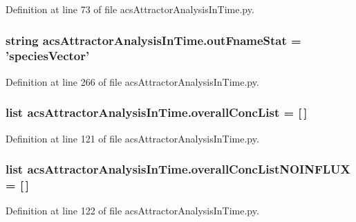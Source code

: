 Definition at line 73 of file acs\+Attractor\+Analysis\+In\+Time.\+py.

\hypertarget{a00125_a05e902a00f3333a303563029c80605de}{
\subsubsection[{out\+Fname\+Stat}]{\setlength{\rightskip}{0pt plus 5cm}string acs\+Attractor\+Analysis\+In\+Time.\+out\+Fname\+Stat = 'species\+Vector'}}\label{a00125_a05e902a00f3333a303563029c80605de}


Definition at line 266 of file acs\+Attractor\+Analysis\+In\+Time.\+py.

\hypertarget{a00125_a2cebadd75179c46e551a2facbdd2741b}{
\subsubsection[{overall\+Conc\+List}]{\setlength{\rightskip}{0pt plus 5cm}list acs\+Attractor\+Analysis\+In\+Time.\+overall\+Conc\+List = \mbox{[}$\,$\mbox{]}}}\label{a00125_a2cebadd75179c46e551a2facbdd2741b}


Definition at line 121 of file acs\+Attractor\+Analysis\+In\+Time.\+py.

\hypertarget{a00125_ad7eab833592c6cd395f9e2416dd13920}{
\subsubsection[{overall\+Conc\+List\+N\+O\+I\+N\+F\+L\+U\+X}]{\setlength{\rightskip}{0pt plus 5cm}list acs\+Attractor\+Analysis\+In\+Time.\+overall\+Conc\+List\+N\+O\+I\+N\+F\+L\+U\+X = \mbox{[}$\,$\mbox{]}}}\label{a00125_ad7eab833592c6cd395f9e2416dd13920}


Definition at line 122 of file acs\+Attractor\+Analysis\+In\+Time.\+py.

